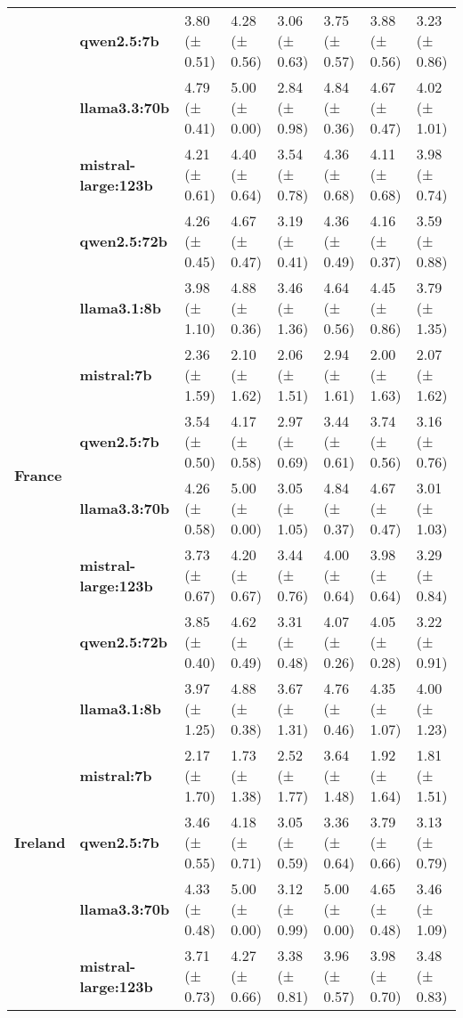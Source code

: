 \begin{longtable}{llllllll}
\textbf{} & \textbf{qwen2.5:7b} & 3.80 (± 0.51) & 4.28 (± 0.56) & 3.06 (± 0.63) & 3.75 (± 0.57) & 3.88 (± 0.56) & 3.23 (± 0.86) \\
\textbf{} & \textbf{llama3.3:70b} & 4.79 (± 0.41) & 5.00 (± 0.00) & 2.84 (± 0.98) & 4.84 (± 0.36) & 4.67 (± 0.47) & 4.02 (± 1.01) \\
\textbf{} & \textbf{mistral-large:123b} & 4.21 (± 0.61) & 4.40 (± 0.64) & 3.54 (± 0.78) & 4.36 (± 0.68) & 4.11 (± 0.68) & 3.98 (± 0.74) \\
\textbf{} & \textbf{qwen2.5:72b} & 4.26 (± 0.45) & 4.67 (± 0.47) & 3.19 (± 0.41) & 4.36 (± 0.49) & 4.16 (± 0.37) & 3.59 (± 0.88) \\
\cline{1-8}
\multirow[t]{6}{*}{\textbf{France}} & \textbf{llama3.1:8b} & 3.98 (± 1.10) & 4.88 (± 0.36) & 3.46 (± 1.36) & 4.64 (± 0.56) & 4.45 (± 0.86) & 3.79 (± 1.35) \\
\textbf{} & \textbf{mistral:7b} & 2.36 (± 1.59) & 2.10 (± 1.62) & 2.06 (± 1.51) & 2.94 (± 1.61) & 2.00 (± 1.63) & 2.07 (± 1.62) \\
\textbf{} & \textbf{qwen2.5:7b} & 3.54 (± 0.50) & 4.17 (± 0.58) & 2.97 (± 0.69) & 3.44 (± 0.61) & 3.74 (± 0.56) & 3.16 (± 0.76) \\
\textbf{} & \textbf{llama3.3:70b} & 4.26 (± 0.58) & 5.00 (± 0.00) & 3.05 (± 1.05) & 4.84 (± 0.37) & 4.67 (± 0.47) & 3.01 (± 1.03) \\
\textbf{} & \textbf{mistral-large:123b} & 3.73 (± 0.67) & 4.20 (± 0.67) & 3.44 (± 0.76) & 4.00 (± 0.64) & 3.98 (± 0.64) & 3.29 (± 0.84) \\
\textbf{} & \textbf{qwen2.5:72b} & 3.85 (± 0.40) & 4.62 (± 0.49) & 3.31 (± 0.48) & 4.07 (± 0.26) & 4.05 (± 0.28) & 3.22 (± 0.91) \\
\cline{1-8}
\multirow[t]{6}{*}{\textbf{Ireland}} & \textbf{llama3.1:8b} & 3.97 (± 1.25) & 4.88 (± 0.38) & 3.67 (± 1.31) & 4.76 (± 0.46) & 4.35 (± 1.07) & 4.00 (± 1.23) \\
\textbf{} & \textbf{mistral:7b} & 2.17 (± 1.70) & 1.73 (± 1.38) & 2.52 (± 1.77) & 3.64 (± 1.48) & 1.92 (± 1.64) & 1.81 (± 1.51) \\
\textbf{} & \textbf{qwen2.5:7b} & 3.46 (± 0.55) & 4.18 (± 0.71) & 3.05 (± 0.59) & 3.36 (± 0.64) & 3.79 (± 0.66) & 3.13 (± 0.79) \\
\textbf{} & \textbf{llama3.3:70b} & 4.33 (± 0.48) & 5.00 (± 0.00) & 3.12 (± 0.99) & 5.00 (± 0.00) & 4.65 (± 0.48) & 3.46 (± 1.09) \\
\textbf{} & \textbf{mistral-large:123b} & 3.71 (± 0.73) & 4.27 (± 0.66) & 3.38 (± 0.81) & 3.96 (± 0.57) & 3.98 (± 0.70) & 3.48 (± 0.83) \\

\end{longtable}
